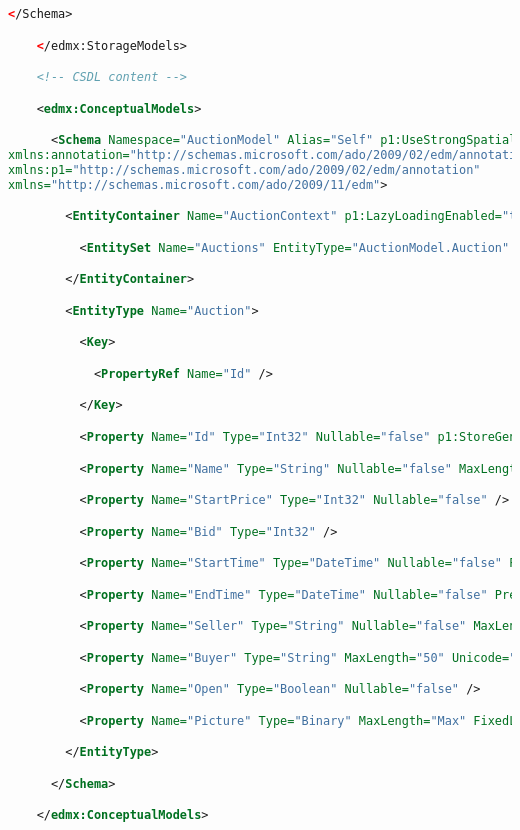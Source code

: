 \documentclass[a4paper,10pt]{scrreprt}
\begin{document}
\begin{lstlisting}[caption=sample edmx file,language=xml]
      </Schema>

    </edmx:StorageModels>

    <!-- CSDL content -->

    <edmx:ConceptualModels>

      <Schema Namespace="AuctionModel" Alias="Self" p1:UseStrongSpatialTypes="false" 
xmlns:annotation="http://schemas.microsoft.com/ado/2009/02/edm/annotation" 
xmlns:p1="http://schemas.microsoft.com/ado/2009/02/edm/annotation" 
xmlns="http://schemas.microsoft.com/ado/2009/11/edm">

        <EntityContainer Name="AuctionContext" p1:LazyLoadingEnabled="true">

          <EntitySet Name="Auctions" EntityType="AuctionModel.Auction" />

        </EntityContainer>

        <EntityType Name="Auction">

          <Key>

            <PropertyRef Name="Id" />

          </Key>

          <Property Name="Id" Type="Int32" Nullable="false" p1:StoreGeneratedPattern="Identity" />

          <Property Name="Name" Type="String" Nullable="false" MaxLength="50" Unicode="true" FixedLength="true" />

          <Property Name="StartPrice" Type="Int32" Nullable="false" />

          <Property Name="Bid" Type="Int32" />

          <Property Name="StartTime" Type="DateTime" Nullable="false" Precision="3" />

          <Property Name="EndTime" Type="DateTime" Nullable="false" Precision="3" />

          <Property Name="Seller" Type="String" Nullable="false" MaxLength="50" Unicode="true" FixedLength="true" />

          <Property Name="Buyer" Type="String" MaxLength="50" Unicode="true" FixedLength="true" />

          <Property Name="Open" Type="Boolean" Nullable="false" />

          <Property Name="Picture" Type="Binary" MaxLength="Max" FixedLength="false" />

        </EntityType>

      </Schema>

    </edmx:ConceptualModels>


\end{lstlisting}
\end{document}
